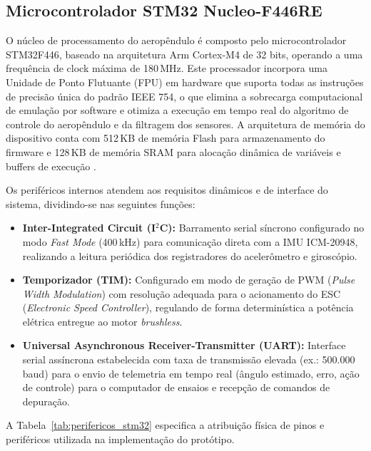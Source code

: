 \subsection{Microcontrolador STM32 Nucleo-F446RE}

O núcleo de processamento do aeropêndulo é composto pelo microcontrolador STM32F446, baseado na arquitetura Arm Cortex-M4 de 32 bits, operando a uma frequência de clock máxima de 180\,MHz. Este processador incorpora uma Unidade de Ponto Flutuante (FPU) em hardware que suporta todas as instruções de precisão única do padrão IEEE 754, o que elimina a sobrecarga computacional de emulação por software e otimiza a execução em tempo real do algoritmo de controle do aeropêndulo e da filtragem dos sensores. A arquitetura de memória do dispositivo conta com 512\,KB de memória Flash para armazenamento do firmware e 128\,KB de memória SRAM para alocação dinâmica de variáveis e buffers de execução \cite{strm0390f446}.

Os periféricos internos atendem aos requisitos dinâmicos e de interface do sistema, dividindo-se nas seguintes funções:

\begin{itemize}
    \item \textbf{Inter-Integrated Circuit (I$^2$C):} Barramento serial síncrono configurado no modo \textit{Fast Mode} (400\,kHz) para comunicação direta com a IMU ICM-20948, realizando a leitura periódica dos registradores do acelerômetro e giroscópio.
    \item \textbf{Temporizador (TIM):} Configurado em modo de geração de PWM (\textit{Pulse Width Modulation}) com resolução adequada para o acionamento do ESC (\textit{Electronic Speed Controller}), regulando de forma determinística a potência elétrica entregue ao motor \textit{brushless}.
    \item \textbf{Universal Asynchronous Receiver-Transmitter (UART):} Interface serial assíncrona estabelecida com taxa de transmissão elevada (ex.: 500.000\,baud) para o envio de telemetria em tempo real (ângulo estimado, erro, ação de controle) para o computador de ensaios e recepção de comandos de depuração.
\end{itemize}

A Tabela~\ref{tab:perifericos_stm32} especifica a atribuição física de pinos e periféricos utilizada na implementação do protótipo.

